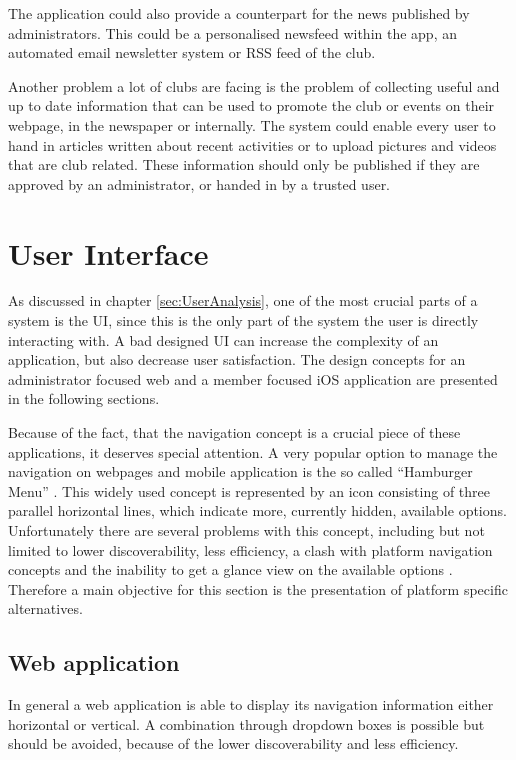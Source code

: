 The application could also provide a counterpart for the news published by administrators. This could be a personalised newsfeed within the app, an automated email newsletter system or \gls{RSS} feed of the club.

Another problem a lot of clubs are facing is the problem of collecting useful and up to date information that can be used to promote the club or events on their webpage, in the newspaper or internally. The system could enable every user to hand in articles written about recent activities or to upload pictures and videos that are club related. These information should only be published if they are approved by an administrator, or handed in by a trusted user.

\section{User Interface} %

As discussed in chapter \vref{sec:UserAnalysis}, one of the most crucial parts of a system is the \gls{UI}, since this is the only part of the system the user is directly interacting with. A bad designed \gls{UI} can increase the complexity of an application, but also decrease user satisfaction. The design concepts for an administrator focused web and a member focused iOS application are presented in the following sections.

Because of the fact, that the navigation concept is a crucial piece of these applications, it deserves special attention. A very popular option to manage the navigation on webpages and mobile application is the so called \enquote{Hamburger Menu} \cite{Abreu:2014aa}. This widely used concept is represented by an icon consisting of three parallel horizontal lines, which indicate more, currently hidden, available options. Unfortunately there are several problems with this concept, including but not limited to lower discoverability, less efficiency, a clash with platform navigation concepts and the inability to get a glance view on the available options \cite{Abreu:2014aa}. Therefore a main objective for this section is the presentation of platform specific alternatives.

\subsection{Web application}
\label{sec:UIConceptWeb}

In general a web application is able to display its navigation information either horizontal or vertical. A combination through dropdown boxes is possible but should be avoided, because of the lower discoverability and less efficiency. \cite{Crestodina:2015aa}

